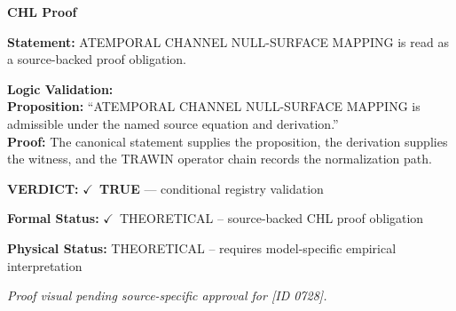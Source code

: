 \vspace{0.45em}
\noindent\textbf{CHL Proof}\par
\textbf{Statement:} ATEMPORAL CHANNEL NULL-SURFACE MAPPING is read as a source-backed proof obligation.

\textbf{Logic Validation:}\\
\textbf{Proposition:} ``ATEMPORAL CHANNEL NULL-SURFACE MAPPING is admissible under the named source equation and derivation.''\\
\textbf{Proof:} The canonical statement supplies the proposition, the derivation supplies the witness, and the TRAWIN operator chain records the normalization path.

\textbf{VERDICT:} \ensuremath{\checkmark}\ \textbf{TRUE} --- conditional registry validation

\textbf{Formal Status:} \ensuremath{\checkmark}\ THEORETICAL -- source-backed CHL proof obligation

\textbf{Physical Status:} THEORETICAL -- requires model-specific empirical interpretation
\par\vspace{0.45em}
\par
\vfill
\begingroup\footnotesize\itshape
Proof visual pending source-specific approval for [ID 0728].
\par\endgroup
\vfill
\endgroup
\endgroup
